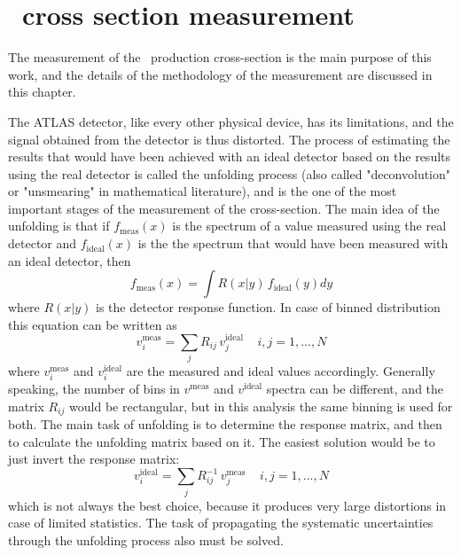 \chapter{\Zee\ cross section measurement}
\label{sec:ZeeCrossSec}

The measurement of the \Zee\ production cross-section is the main purpose of this work, and the details of the methodology of the measurement are discussed in this chapter.

The ATLAS detector, like every other physical device, has its limitations, and the signal obtained from the detector is thus distorted. The process of estimating the results that would have been achieved with an ideal detector based on the results using the real detector is called the unfolding process (also called "deconvolution" or "unsmearing" in mathematical literature), and is the one of the most important stages of the measurement of the cross-section. The main idea of the unfolding is that if $f_\mathrm{meas}(x)$ is the spectrum of a value measured using the real detector and $f_\mathrm{ideal}(x)$ is the the spectrum that would have been measured with an ideal detector, then
\begin{equation}
f_\mathrm{meas}(x) = \int R(x|y) \, f_\mathrm{ideal}(y)dy
\end{equation}
where $R(x|y)$ is the detector response function. In case of binned distribution this equation can be written as
\begin{equation}
v^\mathrm{meas}_i = \sum_j R_{ij} \, v^\mathrm{ideal}_j \:\:\:\:\: i,j = 1, ... ,N
\end{equation}
where $v^\mathrm{meas}_i$ and $v^\mathrm{ideal}_i$ are the measured and ideal values accordingly. Generally speaking, the number of bins in $v^\mathrm{meas}$ and $v^\mathrm{ideal}$ spectra can be different, and the matrix $R_{ij}$ would be rectangular, but in this analysis the same binning is used for both. The main task of unfolding is to determine the response matrix, and then to calculate the unfolding matrix based on it. The easiest solution would be to just invert the response matrix:
\begin{equation}
v^\mathrm{ideal}_i = \sum_j R^{-1}_{ij} \, v^\mathrm{meas}_j \:\:\:\:\: i,j = 1, ... ,N
\end{equation}
which is not always the best choice, because it produces very large distortions in case of limited statistics. The task of propagating the systematic uncertainties through the unfolding process also must be solved.

